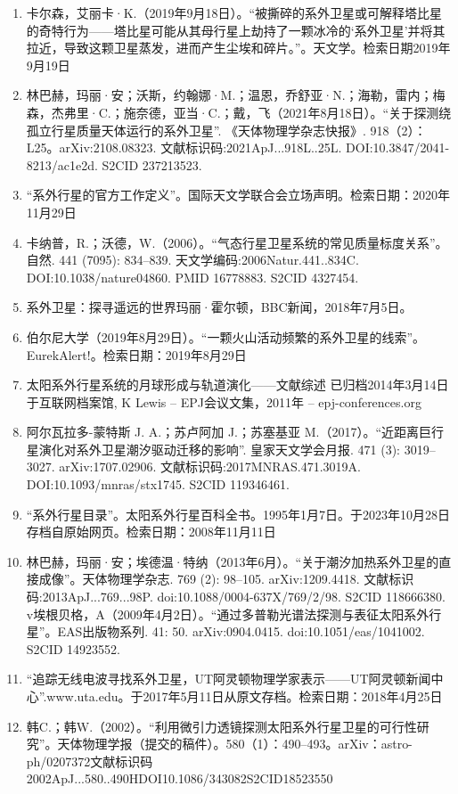 \begin{enumerate}
\item 卡尔森，艾丽卡·K.（2019年9月18日）。“被撕碎的系外卫星或可解释塔比星的奇特行为——塔比星可能从其母行星上劫持了一颗冰冷的‘系外卫星’并将其拉近，导致这颗卫星蒸发，进而产生尘埃和碎片。”。天文学。检索日期2019年9月19日
\item 林巴赫，玛丽·安；沃斯，约翰娜·M.；温恩，乔舒亚·N.；海勒，雷内；梅森，杰弗里·C.；施奈德，亚当·C.；戴，飞（2021年8月18日）。“关于探测绕孤立行星质量天体运行的系外卫星”. 《天体物理学杂志快报》. 918（2）：L25。arXiv:2108.08323. 文献标识码:2021ApJ...918L..25L. DOI:10.3847/2041-8213/ac1e2d. S2CID 237213523.
\item “系外行星的官方工作定义”。国际天文学联合会立场声明。检索日期：2020年11月29日
\item 卡纳普，R.；沃德，W.（2006）。“气态行星卫星系统的常见质量标度关系”。自然. 441 (7095): 834–839. 天文学编码:2006Natur.441..834C. DOI:10.1038/nature04860. PMID 16778883. S2CID 4327454.
\item 系外卫星：探寻遥远的世界玛丽·霍尔顿，BBC新闻，2018年7月5日。
\item 伯尔尼大学（2019年8月29日）。“一颗火山活动频繁的系外卫星的线索”。EurekAlert!。检索日期：2019年8月29日
\item 太阳系外行星系统的月球形成与轨道演化——文献综述 已归档2014年3月14日于互联网档案馆, K Lewis – EPJ会议文集，2011年 – epj-conferences.org
\item 阿尔瓦拉多-蒙特斯 J. A.；苏卢阿加 J.；苏塞基亚 M.（2017）。“近距离巨行星演化对系外卫星潮汐驱动迁移的影响”. 皇家天文学会月报. 471 (3): 3019–3027. arXiv:1707.02906. 文献标识码:2017MNRAS.471.3019A. DOI:10.1093/mnras/stx1745. S2CID 119346461.
\item “系外行星目录”。太阳系外行星百科全书。1995年1月7日。于2023年10月28日存档自原始网页。检索日期：2008年11月11日
\item 林巴赫，玛丽·安；埃德温·特纳（2013年6月）。“关于潮汐加热系外卫星的直接成像”。天体物理学杂志. 769 (2): 98–105. arXiv:1209.4418. 文献标识码:2013ApJ...769...98P. doi:10.1088/0004-637X/769/2/98. S2CID 118666380.
v埃根贝格，A（2009年4月2日）。“通过多普勒光谱法探测与表征太阳系外行星”。EAS出版物系列. 41: 50. arXiv:0904.0415. doi:10.1051/eas/1041002. S2CID 14923552.
\item “追踪无线电波寻找系外卫星，UT阿灵顿物理学家表示——UT阿灵顿新闻中心”.www.uta.edu。于2017年5月11日从原文存档。检索日期：2018年4月25日
\item 韩C.；韩W.（2002）。“利用微引力透镜探测太阳系外行星卫星的可行性研究”。天体物理学报（提交的稿件）。580（1）：490–493。arXiv：astro-ph/0207372文献标识码2002ApJ...580..490HDOI10.1086/343082S2CID18523550

\end{enumerate}
